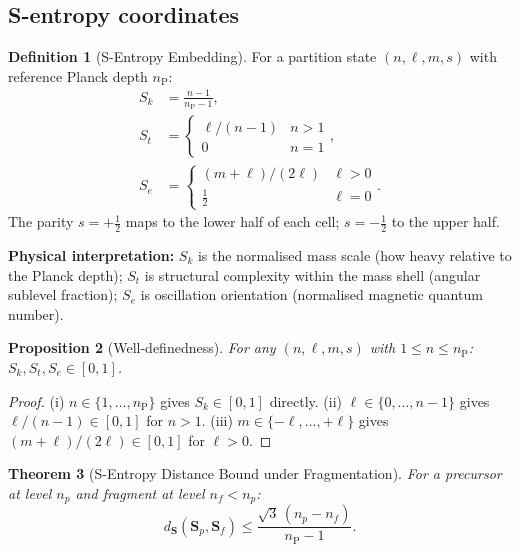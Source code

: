 \documentclass[twocolumn,10pt,a4paper]{article}
\theoremstyle{thmstyle}
\newtheorem{theorem}{Theorem}[section]
\newtheorem{proposition}[theorem]{Proposition}
\theoremstyle{definition}
\newtheorem{definition}[theorem]{Definition}
\theoremstyle{remark}
\newcommand{\nP}{n_{\mathrm{P}}}
\newcommand{\Sv}{\mathbf{S}}
\newcommand{\Sk}{S_{k}}
\newcommand{\St}{S_{t}}
\newcommand{\Se}{S_{e}}
\begin{document}
\subsection{S-entropy coordinates}

\begin{definition}[S-Entropy Embedding]
\label{def:scoords}
For a partition state $(n,\ell,m,s)$ with reference Planck depth $\nP$:
\begin{align}
\Sk &= \frac{n-1}{\nP-1}, \label{eq:sk}\\[2pt]
\St &= \begin{cases}\ell/(n-1) & n > 1 \\ 0 & n = 1\end{cases},
\label{eq:st}\\[2pt]
\Se &= \begin{cases}(m+\ell)/(2\ell) & \ell > 0 \\ \tfrac{1}{2} & \ell = 0\end{cases}.
\label{eq:se}
\end{align}
The parity $s = +\tfrac{1}{2}$ maps to the lower half of each cell;
$s = -\tfrac{1}{2}$ to the upper half.
\end{definition}

\textbf{Physical interpretation:}
$\Sk$ is the normalised mass scale (how heavy relative to the Planck depth);
$\St$ is structural complexity within the mass shell (angular sublevel
fraction); $\Se$ is oscillation orientation (normalised magnetic quantum
number).

\begin{proposition}[Well-definedness]
For any $(n,\ell,m,s)$ with $1 \leq n \leq \nP$: $\Sk,\St,\Se \in [0,1]$.
\end{proposition}

\begin{proof}
(i) $n \in \{1,\ldots,\nP\}$ gives $\Sk \in [0,1]$ directly.
(ii) $\ell \in \{0,\ldots,n-1\}$ gives $\ell/(n-1) \in [0,1]$ for $n>1$.
(iii) $m \in \{-\ell,\ldots,+\ell\}$ gives $(m+\ell)/(2\ell)\in[0,1]$ for
$\ell>0$.
\end{proof}

\begin{theorem}[S-Entropy Distance Bound under Fragmentation]
For a precursor at level $n_p$ and fragment at level $n_f < n_p$:
\begin{equation}
d_\Sv(\Sv_p, \Sv_f) \leq \frac{\sqrt{3}\,(n_p - n_f)}{\nP - 1}.
\label{eq:dist_bound}
\end{equation}
\end{theorem}
\end{document}

